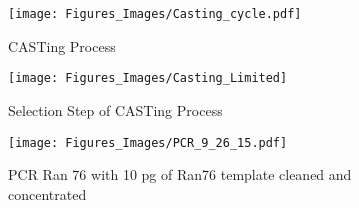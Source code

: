 \documentclass[12pt,twoside]{reedthesis}
\begin{document}
          	\begin{figure}[[h!tbp]
          		\centering
          		\texttt{[image: Figures\_Images/Casting\_cycle.pdf]}
          		\caption[CASTing Overal Cycle Scheme]{CASTing Process}
          		\label{overallcastingscheme}
          	\end{figure}
          	
          	\begin{figure}[[h!tbp]
          		\centering
          		\texttt{[image: Figures\_Images/Casting\_Limited]}
          		\caption[CASTing Selection Scheme]{Selection Step of CASTing Process}
          		\label{Selectionscheme}
          	\end{figure}
    
    \begin{figure}[h!tbp]
    	\centering
    	\texttt{[image: Figures\_Images/PCR\_9\_26\_15.pdf]}
    	\caption[PCR to Create Pool of Random DNA]{PCR Ran 76 with 10 pg of Ran76 template cleaned and concentrated}
    	\label{PCRRan76}
    \end{figure}
    
\end{document}
